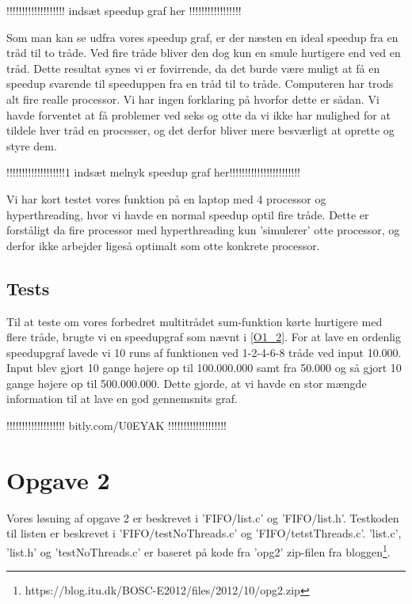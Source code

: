 !!!!!!!!!!!!!!!!!!! indsæt speedup graf her !!!!!!!!!!!!!!!!!

Som man kan se udfra vores speedup graf, er der næsten en ideal speedup fra en tråd til to tråde. Ved fire tråde bliver den dog kun en smule hurtigere end ved en tråd. Dette resultat synes vi er fovirrende, da det burde være muligt at få en speedup svarende til speeduppen fra en tråd til to tråde. Computeren har trods alt fire realle processor. Vi har ingen forklaring på hvorfor dette er sådan. 
Vi havde forventet at få problemer ved seks og otte da vi ikke har mulighed for at tildele hver tråd en processer, og det derfor bliver mere besværligt at oprette og styre dem. 


!!!!!!!!!!!!!!!!!!!1 indsæt melnyk speedup graf her!!!!!!!!!!!!!!!!!!!!!!!


Vi har kort testet vores funktion på en laptop med 4 processor og hyperthreading, hvor vi havde en normal speedup optil fire tråde. Dette er forståligt da fire processor med hyperthreading kun 'simulerer' otte processor, og derfor ikke arbejder ligeså optimalt som otte konkrete processor.

\subsection{Tests}
\label{O1_Tests}
Til at teste om vores forbedret multitrådet sum-funktion kørte hurtigere med flere tråde, brugte vi en speedupgraf som nævnt i \ref{O1_2}. For at lave en ordenlig speedupgraf lavede vi 10 runs af funktionen ved 1-2-4-6-8 tråde ved input 10.000. Input blev gjort 10 gange højere op til 100.000.000 samt fra 50.000 og så gjort 10 gange højere op til 500.000.000. Dette gjorde, at vi havde en stor mængde information til at lave en god gennemsnits graf. 


!!!!!!!!!!!!!!!!!!!
bitly.com/U0EYAK
!!!!!!!!!!!!!!!!!!!



\section{Opgave 2}
\label{O2}
Vores løsning af opgave 2 er beskrevet i 'FIFO/list.c' og 'FIFO/list.h'. Testkoden til listen er beskrevet i 'FIFO/testNoThreads.c' og 'FIFO/tetstThreads.c'. 'list.c', 'list.h' og 'testNoThreads.c' er baseret på kode fra 'opg2' zip-filen fra bloggen\footnote{https://blog.itu.dk/BOSC-E2012/files/2012/10/opg2.zip}.
